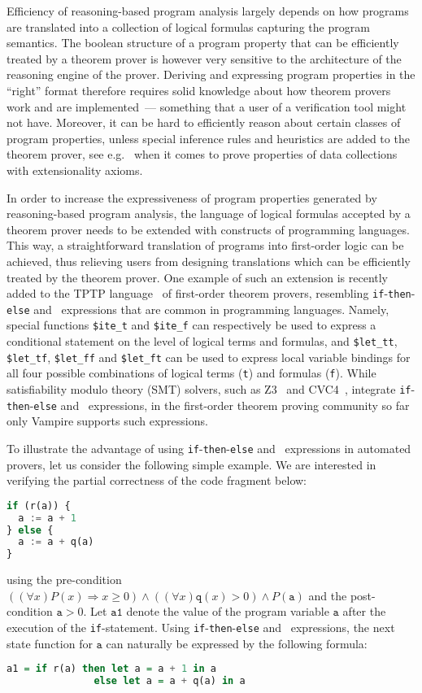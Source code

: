 Efficiency of reasoning-based program analysis largely depends on how programs are translated into a collection of logical formulas capturing the program semantics. The boolean structure of a program property that can be efficiently treated by a theorem prover is however very sensitive to the architecture of the reasoning engine of the prover. Deriving and expressing program properties in the ``right'' format therefore requires solid knowledge about how theorem provers work and are implemented~--- something that a user of a verification tool might not have. Moreover, it can be hard to efficiently reason about certain classes of program properties, unless special inference rules and heuristics are added to the theorem prover, see e.g.~\cite{ATVA14} when it comes to prove properties of data collections with extensionality axioms.

In order to increase the expressiveness of program properties generated by reasoning-based program analysis, the language of logical formulas accepted by a theorem prover needs to be extended with constructs of programming languages. This way, a straightforward translation of programs into first-order logic can be achieved, thus relieving users from designing translations which can be efficiently treated by the theorem prover.
One example of such an extension is recently added to the TPTP language~\cite{TPTP} of first-order theorem provers, resembling \verb'if'-\verb'then'-\verb'else' and \LETIN\ expressions that are common in programming languages. Namely, special functions \verb'$ite_t' and \verb'$ite_f' can respectively be used to express a conditional statement on the level of logical terms and formulas, and \verb'$let_tt', \verb'$let_tf', \verb'$let_ff' and \texttt{\$let\_ft} can be used to express local variable bindings for all four possible combinations of logical terms (\verb't') and formulas (\verb'f'). While satisfiability modulo theory (SMT) solvers, such as Z3~\cite{Z3} and CVC4~\cite{CVC4}, integrate \verb'if'-\verb'then'-\verb'else' and \LETIN\ expressions, in the first-order theorem proving community so far only Vampire supports such expressions.

To illustrate the advantage of using \verb'if'-\verb'then'-\verb'else' and \LETIN\ expressions in automated provers, let us consider the following  simple example. We are interested in verifying the partial correctness of the code fragment below:
\begin{lstlisting}[language=haskell]
if (r(a)) {
  a := a + 1
} else {
  a := a + q(a)
}
\end{lstlisting}
using the pre-condition $((\forall x) P(x) \Rightarrow x \ge 0) \wedge ((\forall x) \mathtt{q}(x) > 0) \wedge P(\mathtt{a})$ and the post-condition $\mathtt{a} > 0$.
Let $\mathtt{a1}$ denote the value of the program variable $\mathtt{a}$ after the execution of the \verb'if'-statement. Using \verb'if'-\verb'then'-\verb'else' and \LETIN\ expressions, the next state function for $\mathtt{a}$ can naturally be expressed by the following formula:
\begin{lstlisting}[language=haskell]
a1 = if r(a) then let a = a + 1 in a
               else let a = a + q(a) in a
\end{lstlisting}

